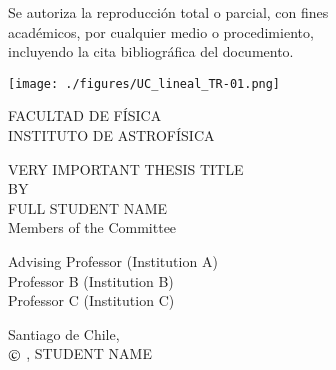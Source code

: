\documentclass[12pt]{mythesis}
\makeatletter
\newcommand\Romanyear{\@Roman{\year}}
\makeatother
\begin{document}
\begin{center}
\vspace*{0.25\textheight}
Se autoriza la reproducci\'{o}n total o parcial, con fines\\ 
acad\'{e}micos, por cualquier medio o procedimiento,\\ 
incluyendo la cita bibliogr\'{a}fica del documento.
\vspace*{\fill}
\end{center}
\newpage
\makeatletter\@twosidefalse\makeatother
{}

\pagestyle{empty}
\vspace*{-40.0mm}%
\hspace*{-10mm}%
        \parbox{80pt}
{\centering %
            \texttt{[image: ./figures/UC\_lineal\_TR-01.png]}\\[.2\normalbaselineskip]   
        }
\begin{flushright}
\vspace*{-9.0mm}
FACULTAD DE F\'{I}SICA\\
INSTITUTO DE ASTROF\'{I}SICA
\end{flushright}
\begin{center}
\huge{VERY IMPORTANT THESIS TITLE}\\
\vspace{1.5cm}
\normalsize
BY\\
\Large{FULL STUDENT NAME}\\
\vspace{1.5cm}
\vspace{1.cm}
\normalsize Members of the Committee\\
\vspace{.5cm}
\parbox{250pt}{
\large{Advising Professor \hfill (Institution A)\\
Professor B \hfill (Institution B)\\
Professor C \hfill (Institution C)\\}}
\vfill
\normalsize
Santiago de Chile, \monthname\, \the\year\\
\vspace{1.cm}
$\copyright$ \Romanyear, STUDENT NAME
\end{center}
\newpage
\end{document}
